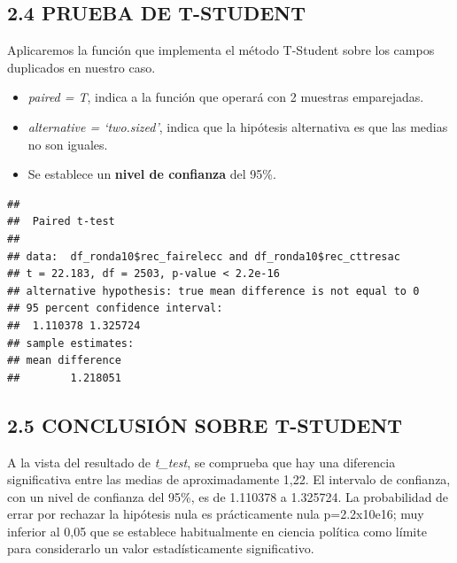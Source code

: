 \documentclass[
  12 pt,
  a4paper,
]{article}
\newenvironment{Shaded}{\begin{snugshade}}{\end{snugshade}}
\newcommand{\AttributeTok}[1]{\textcolor[rgb]{0.13,0.29,0.53}{#1}}
\newcommand{\DecValTok}[1]{\textcolor[rgb]{0.00,0.00,0.81}{#1}}
\newcommand{\FunctionTok}[1]{\textcolor[rgb]{0.13,0.29,0.53}{\textbf{#1}}}
\newcommand{\NormalTok}[1]{#1}
\newcommand{\SpecialCharTok}[1]{\textcolor[rgb]{0.81,0.36,0.00}{\textbf{#1}}}
\newcommand{\StringTok}[1]{\textcolor[rgb]{0.31,0.60,0.02}{#1}}
\begin{document}
\subsection{2.4 PRUEBA DE T-STUDENT}\label{prueba-de-t-student}

Aplicaremos la función que implementa el método T-Student sobre los
campos duplicados en nuestro caso.

\begin{itemize}
\item
  \emph{paired = T}, indica a la función que operará con 2 muestras
  emparejadas.
\item
  \emph{alternative = `two.sized'}, indica que la hipótesis alternativa
  es que las medias no son iguales.
\item
  Se establece un \textbf{nivel de confianza} del 95\%.
\end{itemize}

\begin{Shaded}
\end{Shaded}

\begin{verbatim}
## 
##  Paired t-test
## 
## data:  df_ronda10$rec_fairelecc and df_ronda10$rec_cttresac
## t = 22.183, df = 2503, p-value < 2.2e-16
## alternative hypothesis: true mean difference is not equal to 0
## 95 percent confidence interval:
##  1.110378 1.325724
## sample estimates:
## mean difference 
##        1.218051
\end{verbatim}

\subsection{2.5 CONCLUSIÓN SOBRE
T-STUDENT}\label{conclusiuxf3n-sobre-t-student}

A la vista del resultado de \emph{t\_test}, se comprueba que hay una
diferencia significativa entre las medias de aproximadamente 1,22. El
intervalo de confianza, con un nivel de confianza del 95\%, es de
1.110378 a 1.325724. La probabilidad de errar por rechazar la hipótesis
nula es prácticamente nula p=2.2x10e16; muy inferior al 0,05 que se
establece habitualmente en ciencia política como límite para
considerarlo un valor estadísticamente significativo.
\end{document}
